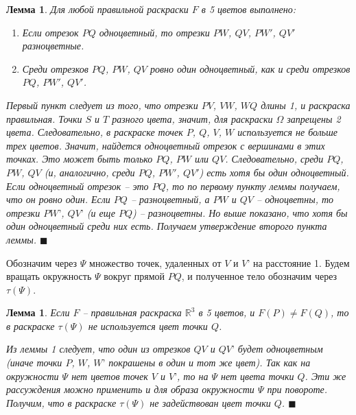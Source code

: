 \documentclass{report}%
\newtheorem{lemma}[theorem]{Лемма}
\newenvironment{proof}{\par\noindent{\bf Доказательство.}}{\hfill$\scriptstyle\blacksquare$}
\begin{document}
\begin{lemma}
		Для любой правильной раскраски $F$ в 5 цветов выполнено:
		\begin{enumerate}
				\item Если отрезок $PQ$ одноцветный, то отрезки $PW$, $QV$, $PW'$, $QV'$ разноцветные. 
				\item Среди отрезков $PQ$, $PW$, $QV$ ровно один одноцветный, как и среди отрезков $PQ$, $PW'$, $QV'$.
		\end{enumerate}
		\begin{proof}
				Первый пункт следует из того, что отрезки $PV$, $VW$, $WQ$ длины 1, и раскраска правильная.
				Точки $S$ и $T$ разного цвета, значит, для раскраски $\Omega$ запрещены 2 цвета.
				Следовательно, в раскраске точек $P$, $Q$, $V$, $W$ используется не больше трех цветов.
				Значит, найдется одноцветный отрезок с вершинами в этих точках. Это может быть только $PQ$, $PW$ или $QV$.
				Следовательно, среди $PQ$, $PW$, $QV$ (и, аналогично, среди $PQ$, $PW'$, $QV'$) есть хотя бы один одноцветный.
				Если одноцветный отрезок – это $PQ$, то по первому пункту леммы получаем, что он ровно один.
				Если $PQ$ – разноцветный, а $PW$ и $QV$ – одноцветны, то отрезки $PW’$, $QV’$ (и еще $PQ$) – разноцветны.
				Но выше показано, что хотя бы один одноцветный среди них есть. Получаем утверждение второго пункта леммы.
		\end{proof}
\end{lemma}

Обозначим через $\Psi$ множество точек, удаленных от $V$ и $V’$ на расстояние 1. Будем вращать окружность $\Psi$ вокруг прямой $PQ$, и полученное тело обозначим через $\tau(\Psi)$.

\begin{lemma}
		Если $F$ – правильная раскраска  $\mathbb{R}^3$ в 5 цветов, и $F(P) \ne F(Q)$,
		то в раскраске $\tau(\Psi)$ не используется цвет точки $Q$. \\
		\begin{proof}
				Из леммы 1 следует, что один из отрезков $QV$ и $QV’$ будет одноцветным
				(иначе точки $P$, $W$, $W’$ покрашены в один и тот же цвет).
				Так как на окружности $\Psi$ нет цветов точек $V$ и $V’$, то на  $\Psi$ нет цвета точки $Q$.
				Эти же рассуждения можно применить и для образа окружности $\Psi$ при повороте.
				Получим, что в раскраске $\tau(\Psi)$ не задействован цвет точки $Q$.
		\end{proof}
\end{lemma}
\end{document}
